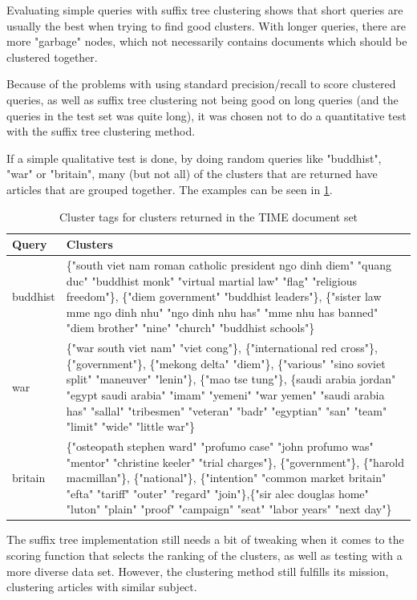 Evaluating simple queries with suffix tree clustering shows that short queries are usually the best when trying to find good clusters. With longer queries, there are more "garbage" nodes, which not necessarily contains documents which should be clustered together.

Because of the problems with using standard precision/recall to score clustered queries, as well as suffix tree clustering not being good on long queries (and the queries in the test set was quite long), it was chosen not to do a quantitative test with the suffix tree clustering method. 

If a simple qualitative test is done, by doing random queries like "buddhist", "war" or "britain", many (but not all) of the clusters that are returned have articles that are grouped together. The examples can be seen in \ref{fig:clusterresults}.

\begin{table}
\begin{tabular}{|l|p{}|}
\hline
Query & Clusters \\
\hline
buddhist & \{"south viet nam roman catholic president ngo dinh diem" "quang duc" "buddhist monk" "virtual martial law" "flag" "religious freedom"\}, \{"diem government" "buddhist leaders"\}, \{"sister law mme ngo dinh nhu" "ngo dinh nhu has" "mme nhu has banned" "diem brother" "nine" "church" "buddhist schools"\}\\ \hline
war & \{"war south viet nam" "viet cong"\}, \{"international red cross"\}, \{"government"\}, \{"mekong delta" "diem"\}, \{"various" "sino soviet split" "maneuver" "lenin"\}, \{"mao tse tung"\}, \{saudi arabia jordan" "egypt saudi arabia" "imam" "yemeni" "war yemen" "saudi arabia has" "sallal" "tribesmen" "veteran" "badr" "egyptian" "san" "team" "limit" "wide" "little war"\}\\ \hline
britain & \{"osteopath stephen ward" "profumo case" "john profumo was" "mentor" "christine keeler" "trial charges"\}, \{"government"\}, \{"harold macmillan"\}, \{"national"\}, \{"intention" "common market britain" "efta" "tariff" "outer" "regard" "join"\},\{"sir alec douglas home" "luton" "plain" "proof" "campaign" "seat" "labor years" "next day"\} \\ \hline

\end{tabular}
\label{fig:clusterresults}
\caption{Cluster tags for clusters returned in the TIME document set}
\end{table}


The suffix tree implementation still needs a bit of tweaking when it comes to the scoring function that selects the ranking of the clusters, as well as testing with a more diverse data set. However, the clustering method still fulfills its mission, clustering articles with similar subject.
